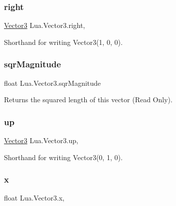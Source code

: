 \subsubsection{\texorpdfstring{right}{right}}
{\footnotesize\ttfamily \mbox{\hyperlink{class_lua_1_1_vector3}{Vector3}} Lua.\+Vector3.\+right\hspace{0.3cm}{\ttfamily [static]}, {\ttfamily [get]}}



Shorthand for writing Vector3(1, 0, 0). 

\mbox{\label{class_lua_1_1_vector3_a29cb25eb011222ce12a27338eb3aa0a2}} 
\subsubsection{\texorpdfstring{sqrMagnitude}{sqrMagnitude}}
{\footnotesize\ttfamily float Lua.\+Vector3.\+sqr\+Magnitude\hspace{0.3cm}{\ttfamily [get]}}



Returns the squared length of this vector (Read Only). 

\mbox{\label{class_lua_1_1_vector3_a63cc0e06476f86bd603c0a56bfa09fae}} 
\subsubsection{\texorpdfstring{up}{up}}
{\footnotesize\ttfamily \mbox{\hyperlink{class_lua_1_1_vector3}{Vector3}} Lua.\+Vector3.\+up\hspace{0.3cm}{\ttfamily [static]}, {\ttfamily [get]}}



Shorthand for writing Vector3(0, 1, 0). 

\mbox{\label{class_lua_1_1_vector3_af2367a6c9fb9484cd8703ef20bbe3e2b}} 
\subsubsection{\texorpdfstring{x}{x}}
{\footnotesize\ttfamily float Lua.\+Vector3.\+x\hspace{0.3cm}{\ttfamily [get]}, {\ttfamily [set]}}



